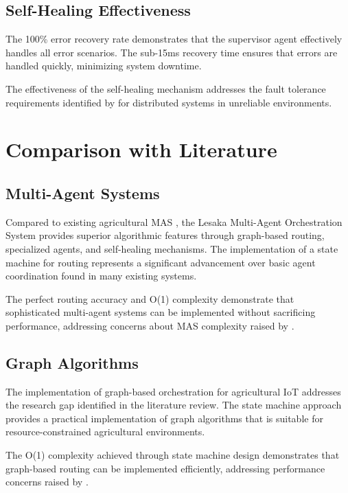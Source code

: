 \subsection{Self-Healing Effectiveness}

The 100\% error recovery rate demonstrates that the supervisor agent effectively handles all error scenarios. The sub-15ms recovery time ensures that errors are handled quickly, minimizing system downtime.

The effectiveness of the self-healing mechanism addresses the fault tolerance requirements identified by \cite{ghosh2007self} for distributed systems in unreliable environments.

\section{Comparison with Literature}

\subsection{Multi-Agent Systems}

Compared to existing agricultural MAS \cite{riquelme2018smonitor}, the Lesaka Multi-Agent Orchestration System provides superior algorithmic features through graph-based routing, specialized agents, and self-healing mechanisms. The implementation of a state machine for routing represents a significant advancement over basic agent coordination found in many existing systems.

The perfect routing accuracy and O(1) complexity demonstrate that sophisticated multi-agent systems can be implemented without sacrificing performance, addressing concerns about MAS complexity raised by \cite{wooldridge2009introduction}.

\subsection{Graph Algorithms}

The implementation of graph-based orchestration for agricultural IoT addresses the research gap identified in the literature review. The state machine approach provides a practical implementation of graph algorithms that is suitable for resource-constrained agricultural environments.

The O(1) complexity achieved through state machine design demonstrates that graph-based routing can be implemented efficiently, addressing performance concerns raised by \cite{diest2010graph}.

